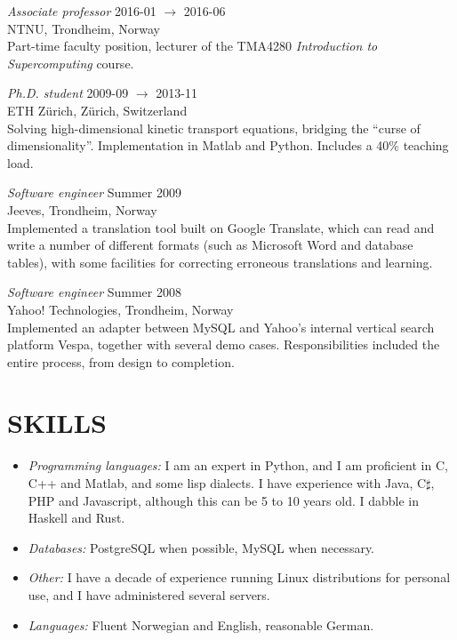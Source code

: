 \documentclass[line,margin]{res}
\newcommand{\zh}{Z\"{u}rich}
\begin{document}
\begin{resume}
{\em Associate professor} \hfill 2016-01 $\to$ 2016-06 \\
NTNU, Trondheim, Norway \\
Part-time faculty position, lecturer of the TMA4280 \emph{Introduction to
  Supercomputing} course.

{\em Ph.D. student} \hfill 2009-09 $\to$ 2013-11 \\
ETH \zh, \zh, Switzerland \\
Solving high-dimensional kinetic transport equations, bridging the ``curse of
dimensionality''. Implementation in Matlab and Python. Includes a 40\% teaching
load.

{\em Software engineer} \hfill Summer 2009 \\
Jeeves, Trondheim, Norway \\
Implemented a translation tool built on Google Translate, which can read and
write a number of different formats (such as Microsoft Word and database
tables), with some facilities for correcting erroneous translations and
learning.

{\em Software engineer} \hfill Summer 2008 \\
Yahoo! Technologies, Trondheim, Norway \\
Implemented an adapter between MySQL and Yahoo's internal vertical search
platform Vespa, together with several demo cases. Responsibilities included the
entire process, from design to completion.


\section{SKILLS}

\begin{itemize}
\item {\em Programming languages:} I am an expert in Python, and I am proficient
  in C, C++ and Matlab, and some lisp dialects. I have experience with Java,
  C$\sharp$, PHP and Javascript, although this can be 5 to 10 years old. I
  dabble in Haskell and Rust.
\item {\em Databases:} PostgreSQL when possible, MySQL when necessary.
\item {\em Other:} I have a decade of experience running Linux distributions for
  personal use, and I have administered several servers.
\item {\em Languages:} Fluent Norwegian and English, reasonable German.
\end{itemize}


\end{resume}
\end{document}
